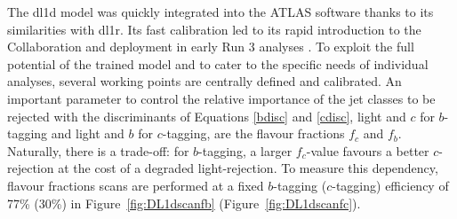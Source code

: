 The \gls{dl1d} model was quickly integrated into the ATLAS software thanks to its similarities with \gls{dl1r}. Its fast calibration led to its rapid introduction to the Collaboration and deployment in early Run 3 analyses \cite{ATLAS-CONF-2022-070}. To exploit the full potential of the trained model and to cater to the specific needs of individual analyses, several working points are centrally defined and calibrated. An important parameter to control the relative importance of the jet classes to be rejected with the discriminants of Equations \ref{bdisc} and \ref{cdisc}, light and $c$ for $b$-tagging and light and $b$ for $c$-tagging, are the flavour fractions $f_c$ and $f_b$. Naturally, there is a trade-off: for $b$-tagging, a larger $f_c$-value favours a better $c$-rejection at the cost of a degraded light-rejection. To measure this dependency, flavour fractions scans are performed at a fixed $b$-tagging ($c$-tagging) efficiency of 77\% (30\%) in Figure~\ref{fig:DL1dscanfb} (Figure~\ref{fig:DL1dscanfc}). \\

